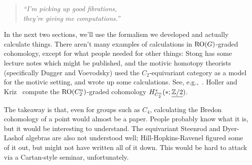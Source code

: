 \begin{quote}\textit{
	``I'm picking up good fibrations,\\
	they're giving me computations.''
}\end{quote}

In the next two sections, we'll use the formalism we developed and actually calculate things. There aren't many
examples of calculations in $\mathrm{RO}(G)$-graded cohomology, except for what people needed for other things: Stong has
some lecture notes which might be published, and the motivic homotopy theorists (specifically Dugger and Voevodsky)
used the $C_2$-equivariant category as a model for the motivic setting, and wrote up some calculations. See,
e.g.,~\cite{Lew88, Dug15}. Holler and Kriz~\cite{HollerKriz} compute the $\mathrm{RO}(C_2^n)$-graded cohomology
$H_{C_2^n}^*(*; \underline{\mathbb Z/2})$.

The takeaway is that, even for groups such as $C_4$, calculating the Bredon cohomology of a point would almost be a
paper. People probably know what it is, but it would be interesting to understand. The equivariant Steenrod and
Dyer-Lashof algebras are also not understood well; Hill-Hopkins-Ravenel figured some of it out, but might not have
written all of it down. This would be hard to attack via a Cartan-style seminar, unfortunately.

